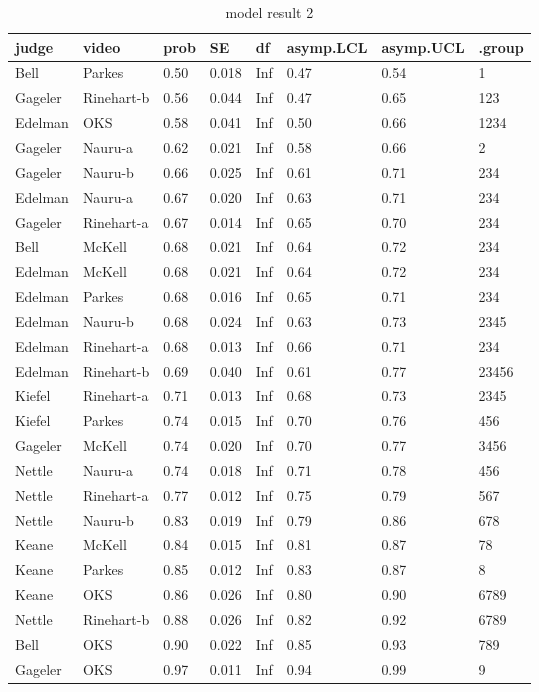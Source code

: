\documentclass{monashthesis}
\begin{document}
\begin{table}[ht]
\begin{center}
\caption{\label{tab:result_2} model result 2}
\begin{tabular}{llllllll}
\toprule
judge & video & prob & SE & df & asymp.LCL & asymp.UCL & .group \\
\midrule
Bell & Parkes & 0.50 & 0.018 & Inf & 0.47 & 0.54 &  1         \\
Gageler & Rinehart-b & 0.56 & 0.044 & Inf & 0.47 & 0.65 &  123       \\
Edelman & OKS & 0.58 & 0.041 & Inf & 0.50 & 0.66 &  1234      \\
Gageler & Nauru-a & 0.62 & 0.021 & Inf & 0.58 & 0.66 &   2        \\
Gageler & Nauru-b & 0.66 & 0.025 & Inf & 0.61 & 0.71 &   234      \\
Edelman & Nauru-a & 0.67 & 0.020 & Inf & 0.63 & 0.71 &   234      \\
Gageler & Rinehart-a & 0.67 & 0.014 & Inf & 0.65 & 0.70 &   234      \\
Bell & McKell & 0.68 & 0.021 & Inf & 0.64 & 0.72 &   234      \\
Edelman & McKell & 0.68 & 0.021 & Inf & 0.64 & 0.72 &   234      \\
Edelman & Parkes & 0.68 & 0.016 & Inf & 0.65 & 0.71 &   234      \\
Edelman & Nauru-b & 0.68 & 0.024 & Inf & 0.63 & 0.73 &   2345     \\
Edelman & Rinehart-a & 0.68 & 0.013 & Inf & 0.66 & 0.71 &   234      \\
Edelman & Rinehart-b & 0.69 & 0.040 & Inf & 0.61 & 0.77 &   23456    \\
Kiefel & Rinehart-a & 0.71 & 0.013 & Inf & 0.68 & 0.73 &   2345     \\
Kiefel & Parkes & 0.74 & 0.015 & Inf & 0.70 & 0.76 &     456    \\
Gageler & McKell & 0.74 & 0.020 & Inf & 0.70 & 0.77 &    3456    \\
Nettle & Nauru-a & 0.74 & 0.018 & Inf & 0.71 & 0.78 &     456    \\
Nettle & Rinehart-a & 0.77 & 0.012 & Inf & 0.75 & 0.79 &      567   \\
Nettle & Nauru-b & 0.83 & 0.019 & Inf & 0.79 & 0.86 &       678  \\
Keane & McKell & 0.84 & 0.015 & Inf & 0.81 & 0.87 &        78  \\
Keane & Parkes & 0.85 & 0.012 & Inf & 0.83 & 0.87 &         8  \\
Keane & OKS & 0.86 & 0.026 & Inf & 0.80 & 0.90 &       6789 \\
Nettle & Rinehart-b & 0.88 & 0.026 & Inf & 0.82 & 0.92 &       6789 \\
Bell & OKS & 0.90 & 0.022 & Inf & 0.85 & 0.93 &        789 \\
Gageler & OKS & 0.97 & 0.011 & Inf & 0.94 & 0.99 &          9 \\
\bottomrule
\end{tabular}
\end{center}
\end{table}
\end{document}
